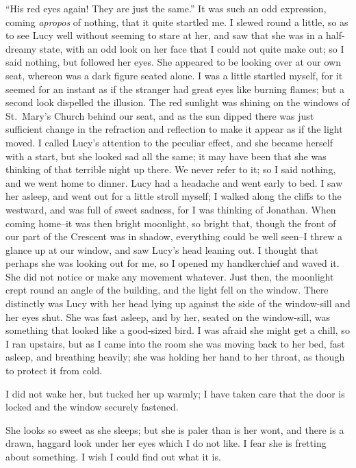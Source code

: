\documentclass[12pt,openright]{book}
\begin{document}
“His red eyes again! They are just the same.” It was such an odd expression, coming \textit{apropos} of nothing, that it quite startled me. I slewed round a little, so as to see Lucy well without seeming to stare at her, and saw that she was in a half-dreamy state, with an odd look on her face that I could not quite make out; so I said nothing, but followed her eyes. She appeared to be looking over at our own seat, whereon was a dark figure seated alone. I was a little startled myself, for it seemed for an instant as if the stranger had great eyes like burning flames; but a second look dispelled the illusion. The red sunlight was shining on the windows of St. Mary’s Church behind our seat, and as the sun dipped there was just sufficient change in the refraction and reflection to make it appear as if the light moved. I called Lucy’s attention to the peculiar effect, and she became herself with a start, but she looked sad all the same; it may have been that she was thinking of that terrible night up there. We never refer to it; so I said nothing, and we went home to dinner. Lucy had a headache and went early to bed. I saw her asleep, and went out for a little stroll myself; I walked along the cliffs to the westward, and was full of sweet sadness, for I was thinking of Jonathan. When coming home–it was then bright moonlight, so bright that, though the front of our part of the Crescent was in shadow, everything could be well seen–I threw a glance up at our window, and saw Lucy’s head leaning out. I thought that perhaps she was looking out for me, so I opened my handkerchief and waved it. She did not notice or make any movement whatever. Just then, the moonlight crept round an angle of the building, and the light fell on the window. There distinctly was Lucy with her head lying up against the side of the window-sill and her eyes shut. She was fast asleep, and by her, seated on the window-sill, was something that looked like a good-sized bird. I was afraid she might get a chill, so I ran upstairs, but as I came into the room she was moving back to her bed, fast asleep, and breathing heavily; she was holding her hand to her throat, as though to protect it from cold.

I did not wake her, but tucked her up warmly; I have taken care that the door is locked and the window securely fastened.

She looks so sweet as she sleeps; but she is paler than is her wont, and there is a drawn, haggard look under her eyes which I do not like. I fear she is fretting about something. I wish I could find out what it is.
\end{document}

